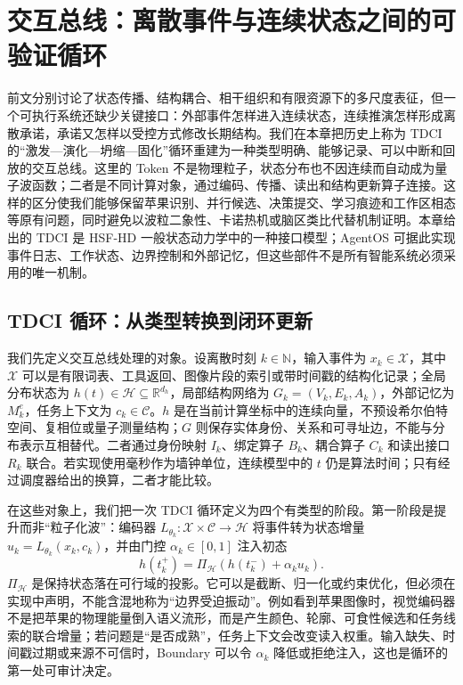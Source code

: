 \chapter{交互总线：离散事件与连续状态之间的可验证循环}
\label{chp:interaction_bus_ch1}

前文分别讨论了状态传播、结构耦合、相干组织和有限资源下的多尺度表征，但一个可执行系统还缺少关键接口：外部事件怎样进入连续状态，连续推演怎样形成离散承诺，承诺又怎样以受控方式修改长期结构。我们在本章把历史上称为 TDCI 的“激发—演化—坍缩—固化”循环重建为一种类型明确、能够记录、可以中断和回放的交互总线。这里的 Token 不是物理粒子，状态分布也不因连续而自动成为量子波函数；二者是不同计算对象，通过编码、传播、读出和结构更新算子连接。这样的区分使我们能够保留苹果识别、并行候选、决策提交、学习痕迹和工作区相态等原有问题，同时避免以波粒二象性、卡诺热机或脑区类比代替机制证明。本章给出的 TDCI 是 HSF-HD 一般状态动力学中的一种接口模型；AgentOS 可据此实现事件日志、工作状态、边界控制和外部记忆，但这些部件不是所有智能系统必须采用的唯一机制。

\section{TDCI 循环：从类型转换到闭环更新}
\label{sec:tdci_detailed_wave_cycle}

我们先定义交互总线处理的对象。设离散时刻 $k\in\mathbb{N}$，输入事件为 $x_k\in\mathcal{X}$，其中 $\mathcal{X}$ 可以是有限词表、工具返回、图像片段的索引或带时间戳的结构化记录；全局分布状态为 $h(t)\in\mathcal{H}\subseteq\mathbb{R}^{d_h}$，局部结构网络为 $G_k=(V_k,E_k,A_k)$，外部记忆为 $M^e_k$，任务上下文为 $c_k\in\mathcal{C}$。$h$ 是在当前计算坐标中的连续向量，不预设希尔伯特空间、复相位或量子测量结构；$G$ 则保存实体身份、关系和可寻址边，不能与分布表示互相替代。二者通过身份映射 $I_k$、绑定算子 $B_k$、耦合算子 $C_k$ 和读出接口 $R_k$ 联合。若实现使用毫秒作为墙钟单位，连续模型中的 $t$ 仍是算法时间；只有经过调度器给出的换算，二者才能比较。

在这些对象上，我们把一次 TDCI 循环定义为四个有类型的阶段。第一阶段是提升而非“粒子化波”：编码器 $L_{\theta_k}:\mathcal{X}\times\mathcal{C}\rightarrow\mathcal{H}$ 将事件转为状态增量 $u_k=L_{\theta_k}(x_k,c_k)$，并由门控 $\alpha_k\in[0,1]$ 注入初态
\[
h(t_k^+)=\Pi_{\mathcal H}\!\left(h(t_k^-)+\alpha_k u_k\right).
\]
$\Pi_{\mathcal H}$ 是保持状态落在可行域的投影。它可以是截断、归一化或约束优化，但必须在实现中声明，不能含混地称为“边界受迫振动”。例如看到苹果图像时，视觉编码器不是把苹果的物理能量倒入语义流形，而是产生颜色、轮廓、可食性候选和任务线索的联合增量；若问题是“是否成熟”，任务上下文会改变读入权重。输入缺失、时间戳过期或来源不可信时，Boundary 可以令 $\alpha_k$ 降低或拒绝注入，这也是循环的第一处可审计决定。

